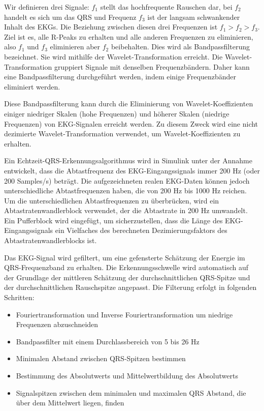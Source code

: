 \documentclass[a4paper,12pt,titlepage]{scrartcl}
\begin{document}
Wir definieren drei Signale: $f_1$ stellt das hochfrequente Rauschen dar, bei $f_2$ handelt es sich um das QRS und Frequenz $f_3$ ist der langsam schwankender Inhalt des EKGs. Die Beziehung zwischen diesen drei Frequenzen ist $f_1>f_2>f_3$.
Ziel ist es, alle R-Peaks zu erhalten und alle anderen Frequenzen zu eliminieren, also $f_1$ und $f_3$ eliminieren aber $f_2$ beibehalten. Dies wird als Bandpassfilterung bezeichnet. Sie wird mithilfe der Wavelet-Transformation erreicht. Die Wavelet-Transformation gruppiert Signale mit denselben Frequenzbändern. Daher kann eine Bandpassfilterung durchgeführt werden, indem einige Frequenzbänder eliminiert werden.

Diese Bandpassfilterung kann durch die Eliminierung von Wavelet-Koeffizienten einiger niedriger Skalen (hohe Frequenzen) und höherer Skalen (niedrige Frequenzen) von EKG-Signalen erreicht werden. Zu diesem Zweck wird eine nicht dezimierte Wavelet-Transformation verwendet, um Wavelet-Koeffizienten zu erhalten.

Ein Echtzeit-QRS-Erkennungsalgorithmus wird in Simulink unter der Annahme entwickelt, dass die Abtastfrequenz des EKG-Eingangssignals immer 200 Hz (oder 200 Samples/s) beträgt. Die aufgezeichneten realen EKG-Daten können jedoch unterschiedliche Abtastfrequenzen haben, die von 200 Hz bis 1000 Hz reichen. Um die unterschiedlichen Abtastfrequenzen zu überbrücken, wird ein Abtastratenwandlerblock verwendet, der die Abtastrate in 200 Hz umwandelt. Ein Pufferblock wird eingefügt, um sicherzustellen, dass die Länge des EKG-Eingangssignals ein Vielfaches des berechneten Dezimierungsfaktors des Abtastratenwandlerblocks ist.

Das EKG-Signal wird gefiltert, um eine gefensterte Schätzung der Energie im QRS-Frequenzband zu erhalten. Die Erkennungsschwelle wird automatisch auf der Grundlage der mittleren Schätzung der durchschnittlichen QRS-Spitze und der durchschnittlichen Rauschspitze angepasst. Die Filterung erfolgt in folgenden Schritten:
\begin{itemize}
    \item Fouriertransformation und Inverse Fouriertransformation um niedrige Frequenzen abzuschneiden
    \item Bandpassfilter mit einem Durchlassbereich von 5 bis 26 Hz
    \item Minimalen Abstand zwischen QRS-Spitzen bestimmen
    \item Bestimmung des Absolutwerts und Mittelwertbildung des Absolutwerts
    \item Signalspitzen zwischen dem minimalen und maximalen QRS Abstand, die über dem Mittelwert liegen, finden
\end{itemize}
\end{document}
